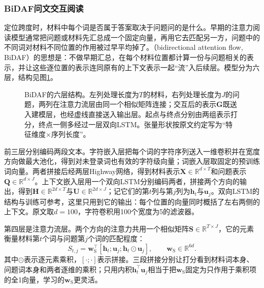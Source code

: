 \subsubsection{BiDAF问文交互阅读}
\label{sec:nlp-dialogue-bidaf}

定位跨度时，材料中每个词是否属于答案取决于问题问的是什么。早期的注意力阅读模型通常把问题或材料先汇总成一个固定向量，再用它去匹配另一方，问题中的不同词对材料不同位置的作用被过早平均掉了。（bidirectional attention flow, BiDAF）的思想是：不做早期汇总，在每个材料位置都计算一份与问题相关的表示，并让这些逐位置的表示连同原有的上下文表示一起“流”入后续层。模型分为六层，结构见图\ref{fig:nlp-dialogue-bidaf}。

\begin{figure}[htbp]
  \centering
  
  \caption{BiDAF的六层结构。左列处理长度为$T$的材料，右列处理长度为$J$的问题，两列在注意力流层由同一个相似矩阵连接；交互后的表示$\bm G$既送入建模层，也经虚线直接送入输出层。起点与终点分别由两组表示打分，终点一侧多经过一层双向LSTM。张量形状按原文约定写为“特征维度$\times$序列长度”。}
  \label{fig:nlp-dialogue-bidaf}
\end{figure}

前三层分别编码两段文本。字符嵌入层把每个词的字符序列送入一维卷积并在宽度方向做最大池化，得到对未登录词也有效的字符级向量；词嵌入层取固定的预训练词向量。两者拼接后经两层Highway网络\cite{srivastava2015highway}，得到材料表示$\bm X\in\mathbb R^{d\times T}$和问题表示$\bm Q\in\mathbb R^{d\times J}$。上下文嵌入层用一个双向LSTM分别编码两者，拼接两个方向的输出，得到$\bm H\in\mathbb R^{2d\times T}$与$\bm U\in\mathbb R^{2d\times J}$；记它们的第$t$列与第$j$列为$\bm h_t$与$\bm u_j$。双向LSTM的结构与训练可参考，这里只用到它的输出：每个位置的向量同时概括了左右两侧的上下文。原文取$d=100$，字符卷积用100个宽度为5的滤波器。

第四层是注意力流层。两个方向的注意力共用一个相似矩阵$\bm S\in\mathbb R^{T\times J}$，它的元素衡量材料第$t$个词与问题第$j$个词的匹配程度：
\begin{equation}
  S_{t,j}=\bm w_{\mathrm S}^{\top}
  [\bm h_t;\bm u_j;\bm h_t\odot\bm u_j],
  \qquad \bm w_{\mathrm S}\in\mathbb R^{6d}.
  \label{eq:nlp-dialogue-bidaf}
\end{equation}
其中$\odot$表示逐元素乘积，$[\cdot;\cdot]$表示拼接。三段拼接分别让打分看到材料词本身、问题词本身和两者逐维的乘积；只用内积$\bm h_t^{\top}\bm u_j$相当于把$\bm w_{\mathrm S}$固定为只作用于乘积项的全1向量，学习的$\bm w_{\mathrm S}$更灵活。

